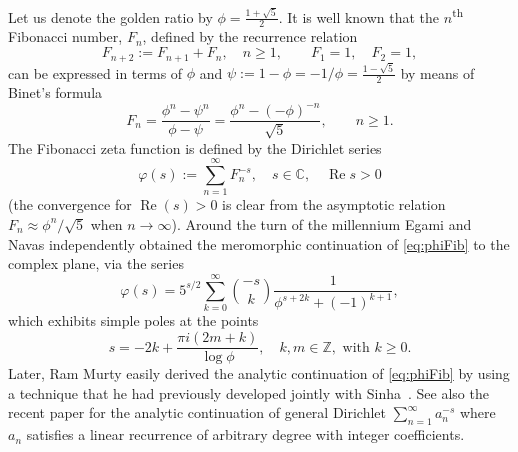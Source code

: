 \documentclass[11pt, a4paper]{article}
\newcommand{\Z}{\mathbb{Z}}
\newcommand{\C}{\mathbb{C}}
\renewcommand{\Re}{\operatorname{Re}}
\theoremstyle{plain}
\theoremstyle{definition}
\begin{document}
Let us denote the golden ratio by $\phi = \frac{1+\sqrt{5}}{2}$. It is well known that the $n$\textsuperscript{th} Fibonacci number, $F_{n}$, defined by the recurrence relation
\[
  F_{n+2} := F_{n+1}+F_{n}, \quad n\geq 1,\qquad F_1=1,\quad F_2=1, 
\]
can be expressed in terms of $\phi$ and $\psi := 1-\phi = -1/\phi = \frac{1-\sqrt{5}}{2}$ by means of Binet's formula 
\begin{equation*}
F_{n} = \frac{\phi^{n} - \psi^n}{\phi - \psi}
= \frac{\phi^{n} - (-\phi)^{-n}}{\sqrt{5}},
\qquad n\geq 1.
\end{equation*}
The Fibonacci zeta function is defined by the Dirichlet series
\begin{equation}
\label{eq:phiFib}
\varphi(s) := \sum_{n=1}^{\infty} F_{n}^{-s},\quad s\in \C,
\quad \Re s>0
\end{equation}
(the convergence for $\Re(s)>0$ is clear from the asymptotic relation $F_{n} \approx \phi^{n}/\sqrt{5}$ when $n\to\infty$). Around the turn of the millennium Egami \cite{Ega} and Navas \cite{Na} independently obtained the meromorphic continuation of \eqref{eq:phiFib} to the complex plane, via the series
\[
\varphi(s) = 5^{s/2} \sum_{k=0}^{\infty}
\binom{-s}{k} \frac{1}{\phi^{s+2k}+(-1)^{k+1}}, 
\]
which exhibits simple poles at the points 
\[
s = -2k+\frac{\pi i(2m+k)}{\log \phi},
\quad k, m\in \Z,
\text{ with }k\geq 0.
\]
Later, Ram Murty \cite{Mur} easily derived the analytic continuation of \eqref{eq:phiFib} by using a technique that he had previously developed jointly with
Sinha~\cite{MurSin}. See also the recent paper \cite{SeNa} for the analytic continuation of general Dirichlet $\sum_{n=1}^{\infty} a_{n}^{-s}$ where $a_{n}$ satisfies a linear recurrence of arbitrary degree with integer coefficients.
\end{document}
